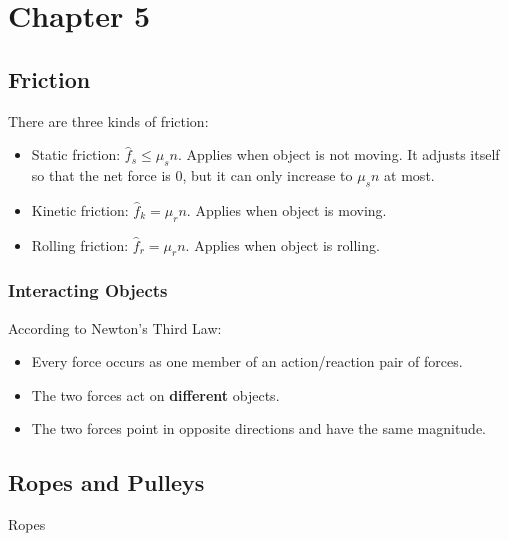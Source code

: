 \section*{Chapter 5}

\subsection*{Friction}

There are three kinds of friction:

\begin{itemize}
    \item Static friction: $\hat{f}_s \leq \mu_s n$. Applies when object is not moving. It adjusts itself so that the net force is 0, but it can only increase to $\mu_s n$ at most.
    \item Kinetic friction: $\hat{f}_k = \mu_r n$. Applies when object is moving.
    \item Rolling friction: $\hat{f}_r = \mu_r n$. Applies when object is rolling.
\end{itemize}

\subsubsection*{Interacting Objects}

According to Newton's Third Law:

\begin{itemize}
    \item Every force occurs as one member of an action/reaction pair of forces.
    \item The two forces act on \textbf{different} objects.
    \item The two forces point in opposite directions and have the same magnitude.
\end{itemize}

\subsection{Ropes and Pulleys}

Ropes
